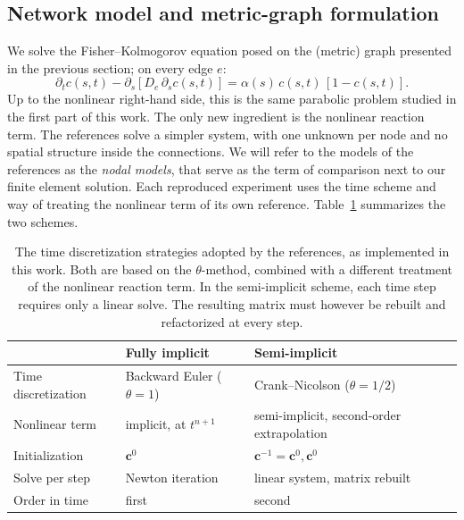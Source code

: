 \subsection{Network model and metric-graph formulation}
\label{sec:formulation}

We solve the Fisher--Kolmogorov equation posed on the (metric) graph presented in the previous section;  on every edge $e$:
\begin{equation}
\partial_t c(s,t) - \partial_s\!\left[D_e\,\partial_s c(s,t)\right]
  = \alpha(s)\,c(s,t)\,[1-c(s,t)].
\label{eq:fk}
\end{equation}
Up to the nonlinear right-hand side, this is the same parabolic problem studied in the first part of this work. The only new ingredient is the nonlinear reaction term. The references solve a simpler system, with one unknown per node and no spatial structure inside the connections. We will refer to the models of the references \cite{cortiFisherKolmogorovGraphs, fornari2019prion} as the \textit{nodal models}, that serve as the term of comparison next to our finite element solution. Each reproduced experiment uses the time scheme and way of treating the nonlinear term of its own reference. Table~\ref{tab:integrators} summarizes the two schemes.

\begin{table}[htbp]
\centering
\setlength{\tabcolsep}{3.5pt}

\begin{tabular}{lll}
\hline
& Fully implicit~\cite{weickenmeier2019prion,fornari2019prion}
& Semi-implicit~\cite{cortiFisherKolmogorovGraphs} \\
\hline

Time discretization
& Backward Euler ($\theta = 1$)
& Crank--Nicolson ($\theta = 1/2$) \\

Nonlinear term
& implicit, at $t^{n+1}$
& semi-implicit, second-order extrapolation \\

Initialization
& $\mathbf{c}^{0}$
& $\mathbf{c}^{-1} = \mathbf{c}^{0}, \mathbf{c}^{0}$ \\

Solve per step
& Newton iteration
& linear system, matrix rebuilt \\

Order in time
& first
& second \\

\hline
\end{tabular}

\caption{\footnotesize The time discretization strategies adopted by the references, as implemented in this work. Both are based on the $\theta$-method, combined with a different treatment of the nonlinear reaction term. In the semi-implicit scheme, each time step requires only a linear solve. The resulting matrix must however be rebuilt and refactorized at every step.}

\label{tab:integrators}
\end{table}


